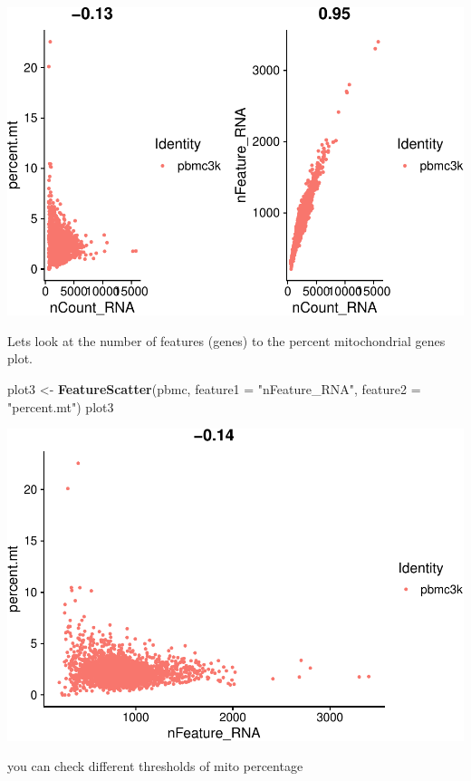 \documentclass[
]{book}
\newenvironment{Shaded}{\begin{snugshade}}{\end{snugshade}}
\newcommand{\AttributeTok}[1]{\textcolor[rgb]{0.13,0.29,0.53}{#1}}
\newcommand{\FunctionTok}[1]{\textcolor[rgb]{0.13,0.29,0.53}{\textbf{#1}}}
\newcommand{\NormalTok}[1]{#1}
\newcommand{\OtherTok}[1]{\textcolor[rgb]{0.56,0.35,0.01}{#1}}
\newcommand{\StringTok}[1]{\textcolor[rgb]{0.31,0.60,0.02}{#1}}
\begin{document}
\includegraphics{scRNAseqInR_Doco_files/figure-latex/qc2-4.pdf}

Lets look at the number of features (genes) to the percent mitochondrial genes plot.

\begin{Shaded}
\begin{Highlighting}[]
\NormalTok{plot3 }\OtherTok{\textless{}{-}} \FunctionTok{FeatureScatter}\NormalTok{(pbmc, }\AttributeTok{feature1 =} \StringTok{"nFeature\_RNA"}\NormalTok{, }\AttributeTok{feature2 =} \StringTok{"percent.mt"}\NormalTok{) }
\NormalTok{plot3}
\end{Highlighting}
\end{Shaded}

\includegraphics{scRNAseqInR_Doco_files/figure-latex/unnamed-chunk-16-1.pdf}

you can check different thresholds of mito percentage
\end{document}
